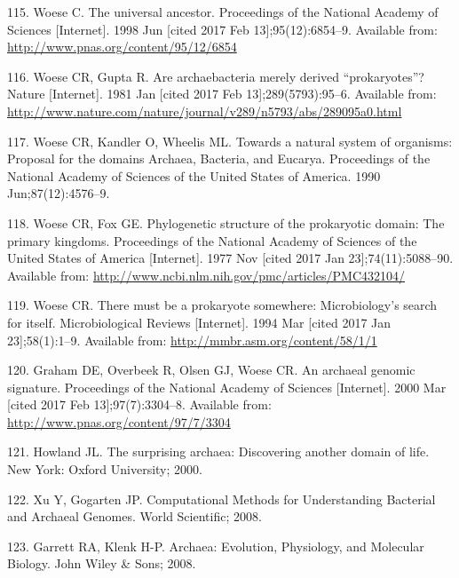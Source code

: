 \documentclass[12pt,twoside]{reedthesis}
\begin{document}
  \hypertarget{ref-woese_universal_1998}{}
  115. Woese C. The universal ancestor. Proceedings of the National
  Academy of Sciences {[}Internet{]}. 1998 Jun {[}cited 2017 Feb
  13{]};95(12):6854--9. Available from:
  \url{http://www.pnas.org/content/95/12/6854}
  
  \hypertarget{ref-woese_are_1981}{}
  116. Woese CR, Gupta R. Are archaebacteria merely derived
  ``prokaryotes''? Nature {[}Internet{]}. 1981 Jan {[}cited 2017 Feb
  13{]};289(5793):95--6. Available from:
  \url{http://www.nature.com/nature/journal/v289/n5793/abs/289095a0.html}
  
  \hypertarget{ref-woese_towards_1990}{}
  117. Woese CR, Kandler O, Wheelis ML. Towards a natural system of
  organisms: Proposal for the domains Archaea, Bacteria, and Eucarya.
  Proceedings of the National Academy of Sciences of the United States of
  America. 1990 Jun;87(12):4576--9.
  
  \hypertarget{ref-woese_phylogenetic_1977}{}
  118. Woese CR, Fox GE. Phylogenetic structure of the prokaryotic domain:
  The primary kingdoms. Proceedings of the National Academy of Sciences of
  the United States of America {[}Internet{]}. 1977 Nov {[}cited 2017 Jan
  23{]};74(11):5088--90. Available from:
  \url{http://www.ncbi.nlm.nih.gov/pmc/articles/PMC432104/}
  
  \hypertarget{ref-woese_there_1994}{}
  119. Woese CR. There must be a prokaryote somewhere: Microbiology's
  search for itself. Microbiological Reviews {[}Internet{]}. 1994 Mar
  {[}cited 2017 Jan 23{]};58(1):1--9. Available from:
  \url{http://mmbr.asm.org/content/58/1/1}
  
  \hypertarget{ref-graham_archaeal_2000}{}
  120. Graham DE, Overbeek R, Olsen GJ, Woese CR. An archaeal genomic
  signature. Proceedings of the National Academy of Sciences
  {[}Internet{]}. 2000 Mar {[}cited 2017 Feb 13{]};97(7):3304--8.
  Available from: \url{http://www.pnas.org/content/97/7/3304}
  
  \hypertarget{ref-howland_surprising_2000}{}
  121. Howland JL. The surprising archaea: Discovering another domain of
  life. New York: Oxford University; 2000.
  
  \hypertarget{ref-xu_computational_2008}{}
  122. Xu Y, Gogarten JP. Computational Methods for Understanding
  Bacterial and Archaeal Genomes. World Scientific; 2008.
  
  \hypertarget{ref-garrett_archaea_2008}{}
  123. Garrett RA, Klenk H-P. Archaea: Evolution, Physiology, and
  Molecular Biology. John Wiley \& Sons; 2008.
  
\end{document}
